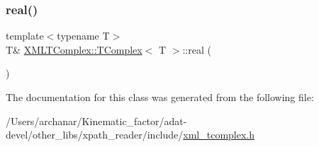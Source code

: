 \mbox{\label{classXMLTComplex_1_1TComplex_a3f7e9b8dd1c6a18da9a944d51d8118c9}} 
\subsubsection{\texorpdfstring{real()}{real()}\hspace{0.1cm}{\footnotesize\ttfamily [3/3]}}
{\footnotesize\ttfamily template$<$typename T$>$ \\
T\& \mbox{\hyperlink{classXMLTComplex_1_1TComplex}{X\+M\+L\+T\+Complex\+::\+T\+Complex}}$<$ T $>$\+::real (\begin{DoxyParamCaption}{ }\end{DoxyParamCaption})\hspace{0.3cm}{\ttfamily [inline]}}



The documentation for this class was generated from the following file\+:\begin{DoxyCompactItemize}
\item 
/\+Users/archanar/\+Kinematic\+\_\+factor/adat-\/devel/other\+\_\+libs/xpath\+\_\+reader/include/\mbox{\hyperlink{adat-devel_2other__libs_2xpath__reader_2include_2xml__tcomplex_8h}{xml\+\_\+tcomplex.\+h}}\end{DoxyCompactItemize}
